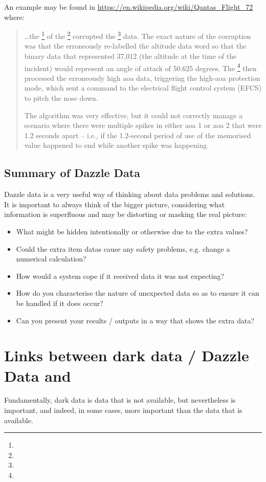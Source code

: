 An example may be found in
\href{https://en.wikipedia.org/wiki/Qantas\_Flight\_72}{https://en.wikipedia.org/wiki/Qantas\_Flight\_72}
where:
\begin{quotation}
  \dots the \footnote{} of the \footnote{} corrupted the \footnote{} data. The exact nature of the corruption was that the   erroneously re-labelled the altitude data word so that the binary data that represented 37,012 (the altitude at the time of the incident) would represent an angle of attack of 50.625 degrees. The \footnote{} then processed the erroneously high \gls{aoa} data, triggering the high-\gls{aoa} protection mode, which sent a command to the electrical flight control system (EFCS) to pitch the nose down.
  
  The  algorithm was very effective, but it could not correctly manage a scenario where there were multiple spikes in either \gls{aoa} 1 or \gls{aoa} 2 that were 1.2 seconds apart -- i.e., if the 1.2-second period of use of the memorised value happened to end while another spike was happening.
  \end{quotation}
\subsection{Summary of Dazzle Data}
Dazzle data is a very useful way of thinking about data problems and solutions.
It is important to always think of the bigger picture,
considering what \gls{information} is superfluous and may be distorting or masking the real picture:
\begin{itemize}
    \item What might be hidden intentionally or otherwise due to the extra values?
    \item Could the extra \glspl{item data} cause any safety problems, e.g. change a numerical calculation?
    \item How would a system cope if it received data it was not expecting?
    \item How do you characterise the nature of unexpected data so as to ensure it can be handled if it does occur?
    \item Can you present your results / outputs in a way that shows the extra data?
\end{itemize}
%
%
\section{Links between dark data / Dazzle Data and }
Fundamentally, dark data is data that is not available, but nevertheless is important, and indeed, in some cases, more important than the data that is available.

